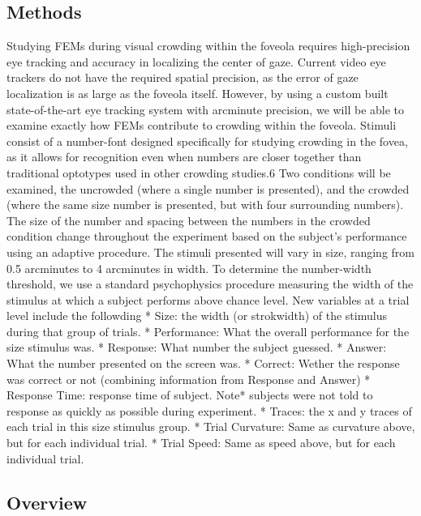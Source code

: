 \documentclass[
]{article}
\begin{document}
\hypertarget{methods}{%
\subsection{Methods}\label{methods}}

Studying FEMs during visual crowding within the foveola requires
high-precision eye tracking and accuracy in localizing the center of
gaze. Current video eye trackers do not have the required spatial
precision, as the error of gaze localization is as large as the foveola
itself. However, by using a custom built state-of-the-art eye tracking
system with arcminute precision, we will be able to examine exactly how
FEMs contribute to crowding within the foveola. Stimuli consist of a
number-font designed specifically for studying crowding in the fovea, as
it allows for recognition even when numbers are closer together than
traditional optotypes used in other crowding studies.6 Two conditions
will be examined, the uncrowded (where a single number is presented),
and the crowded (where the same size number is presented, but with four
surrounding numbers). The size of the number and spacing between the
numbers in the crowded condition change throughout the experiment based
on the subject's performance using an adaptive procedure. The stimuli
presented will vary in size, ranging from 0.5 arcminutes to 4 arcminutes
in width. To determine the number-width threshold, we use a standard
psychophysics procedure measuring the width of the stimulus at which a
subject performs above chance level. New variables at a trial level
include the followding * Size: the width (or strokwidth) of the stimulus
during that group of trials. * Performance: What the overall performance
for the size stimulus was. * Response: What number the subject guessed.
* Answer: What the number presented on the screen was. * Correct: Wether
the response was correct or not (combining information from Response and
Answer) * Response Time: response time of subject. Note* subjects were
not told to response as quickly as possible during experiment. * Traces:
the x and y traces of each trial in this size stimulus group. * Trial
Curvature: Same as curvature above, but for each individual trial. *
Trial Speed: Same as speed above, but for each individual trial.

\hypertarget{overview}{%
\subsection{Overview}\label{overview}}
\end{document}
